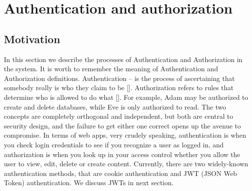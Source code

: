 \chapter{Authentication and authorization}\label{ch:authentication-and-authorization}


\section{Motivation}\label{sec:motivation}
In this section we describe the processes of Authentication and Authorization in the system.
It is worth to remember the meaning of Authentication and Authorization definitions.
Authentication -- is the process of ascertaining that somebody really is who they claim to be [\cite{burrows1989logic}].
Authorization refers to rules that determine who is allowed to do what [\cite{fagin1978authorization}].
For example, Adam may be authorized to create and delete databases, while Eve is only authorized to read.
The two concepts are completely orthogonal and independent, but both are central to security design, and the
failure to get either one correct opens up the avenue to compromise.
In terms of web apps, very crudely speaking, authentication is when you check login credentials to see if you recognize
a user as logged in, and authorization is when you look up in your access control whether you allow the user to view,
edit, delete or create content.
Currently, there are two widely-known authentication methods, that are cookie authentication and JWT (JSON Web Token)
authentication.
We discuss JWTs in next section.



